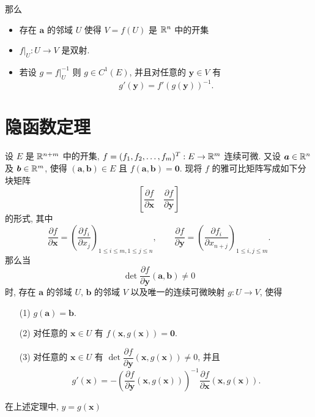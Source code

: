 		那么
		\begin{itemize}[leftmargin=1.5cm]
			\item 存在 $\bm a$ 的邻域 $U$ 使得 $V=f(U)$ 是 $\mathbb {R}^{n}$ 中的开集
			\item $f|_U:U\to V$ 是双射.
			\item 若设 $g=f|_U^{-1}$ 则 $g\in C^1(E)$, 并且对任意的 $\bm y\in V$ 有 	$$g'(\bm y)=f'(g(\bm y))^{-1}.$$
		\end{itemize}

	\section{隐函数定理}
		\begin{theorem}[隐函数定理]
			设 $E$ 是 $\mathbb {R}^{n+m}$ 中的开集, $f=(f_1,f_2,\ldots,f_m)^T:E\to \mathbb {R}^{m}$ 连续可微. 又设 $\bm a \in \mathbb {R}^{n}$ 及 $\bm b \in \mathbb {R}^{m}$, 使得 $(\bm a,\bm b) \in E$ 且 $f(\bm a, \bm b)=\bm 0$. 现将 $f$ 的雅可比矩阵写成如下分块矩阵
			$$\left[\dfrac{\partial f}{\partial \bm x}\quad  \dfrac{\partial f}{\partial \bm y}\right]$$
			的形式, 其中
			$$\dfrac{\partial f}{\partial\bm x}=\left(\dfrac{\partial f_i}{\partial x_j}\right)_{1\le i \le m, 1\le j \le n},\qquad \dfrac{\partial f}{\partial \bm y}=\left(\dfrac{\partial f_i}{\partial x_{n+j}}\right)_{1 \le i,j \le m}.$$
			那么当 $$\det \dfrac{\partial f}{\partial \bm y}(\bm a,\bm b)\neq0$$
			时, 存在 $\bm a$ 的邻域 $U$, $\bm b$ 的邻域 $V$ 以及唯一的连续可微映射 $g:U\to V$, 使得
				\begin{itemize}[leftmargin=1.5cm,itemindent=0cm]
					\item[(1)] $g(\bm a)=\bm b$.
					\item[(2)] 对任意的 $\bm x \in U$ 有 $f(\bm x,g(\bm x))=\bm 0$.
					\item[(3)] 对任意的 $\bm x \in U$ 有 $\det \dfrac{\partial f}{\partial \bm y}(\bm x,g(\bm x))\neq 0$, 并且
								$$g'(\bm x)=-\left(\dfrac{\partial f}{\partial \bm y}(\bm x,g(\bm x))\right)^{-1}\dfrac{\partial f}{\partial \bm x}(\bm x,g(\bm x)).$$
				\end{itemize}
		\end{theorem}

		\begin{definition}
			在上述定理中, $y=g(\bm x)$
		\end{definition}